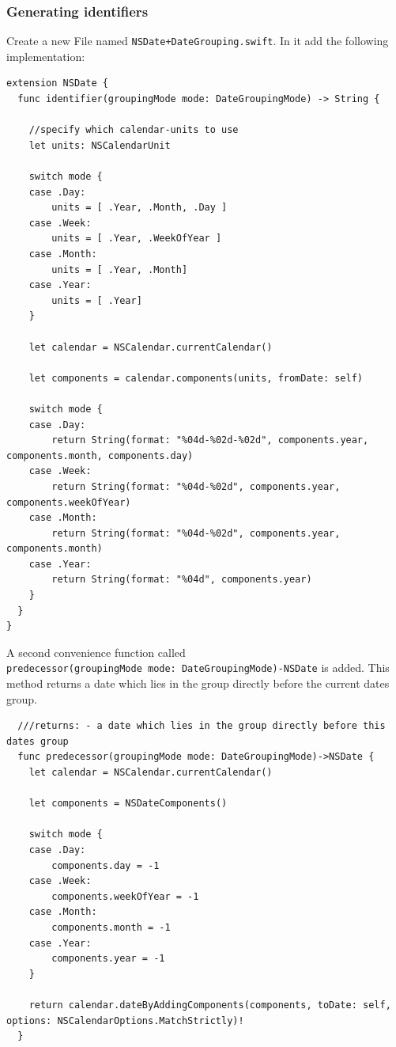 \documentclass{article}
\begin{document}
\subsubsection{Generating identifiers}\label{generating-identifiers}
Create a new File named \texttt{NSDate+DateGrouping.swift}.
In it add the following implementation:

\begin{verbatim}
extension NSDate {
  func identifier(groupingMode mode: DateGroupingMode) -> String {

    //specify which calendar-units to use
    let units: NSCalendarUnit

    switch mode {
    case .Day:
        units = [ .Year, .Month, .Day ]
    case .Week:
        units = [ .Year, .WeekOfYear ]
    case .Month:
        units = [ .Year, .Month]
    case .Year:
        units = [ .Year]
    }

    let calendar = NSCalendar.currentCalendar()

    let components = calendar.components(units, fromDate: self)

    switch mode {
    case .Day:
        return String(format: "%04d-%02d-%02d", components.year, components.month, components.day)
    case .Week:
        return String(format: "%04d-%02d", components.year, components.weekOfYear)
    case .Month:
        return String(format: "%04d-%02d", components.year, components.month)
    case .Year:
        return String(format: "%04d", components.year)
    }
  }
}
\end{verbatim}

A second convenience function called
\texttt{predecessor(groupingMode\ mode:\ DateGroupingMode)-NSDate}
is added. This method returns a date which lies in the group directly
before the current dates group.

\begin{verbatim}
  ///returns: - a date which lies in the group directly before this dates group
  func predecessor(groupingMode mode: DateGroupingMode)->NSDate {
    let calendar = NSCalendar.currentCalendar()

    let components = NSDateComponents()

    switch mode {
    case .Day:
        components.day = -1
    case .Week:
        components.weekOfYear = -1
    case .Month:
        components.month = -1
    case .Year:
        components.year = -1
    }

    return calendar.dateByAddingComponents(components, toDate: self, options: NSCalendarOptions.MatchStrictly)!
  }
\end{verbatim}
\end{document}
